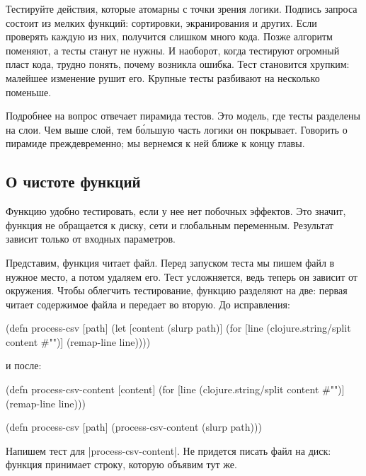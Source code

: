 Тестируйте действия, которые атомарны с точки зрения логики. Подпись запроса
состоит из мелких функций: сортировки, экранирования и других. Если проверять
каждую из них, получится слишком много кода. Позже алгоритм поменяют, а тесты
станут не нужны. И наоборот, когда тестируют огромный пласт кода, трудно понять,
почему возникла ошибка. Тест становится хрупким: малейшее изменение рушит
его. Крупные тесты разбивают на несколько поменьше.

Подробнее на вопрос отвечает пирамида
тестов. Это модель, где
тесты разделены на слои. Чем выше слой, тем б\'{о}льшую часть логики он
покрывает. Говорить о пирамиде преждевременно; мы вернемся к ней ближе к концу
главы.

\subsection{О чистоте функций}

Функцию удобно тестировать, если у нее нет побочных эффектов. Это значит,
функция не обращается к диску, сети и глобальным переменным. Результат зависит
только от входных параметров.

Представим, функция читает файл. Перед запуском теста мы пишем файл в нужное
место, а потом удаляем его. Тест усложняется, ведь теперь он зависит от
окружения. Чтобы облегчить тестирование, функцию разделяют на две: первая читает
содержимое файла и передает во вторую. До исправления:

\begin{english}
  \begin{clojure}
(defn process-csv [path]
  (let [content (slurp path)]
    (for [line (clojure.string/split content #"\n")]
      (remap-line line))))
  \end{clojure}
\end{english}

\noindent
и после:

\begin{english}
  \begin{clojure}
(defn process-csv-content [content]
  (for [line (clojure.string/split content #"\n")]
    (remap-line line)))

(defn process-csv [path]
  (process-csv-content (slurp path)))
  \end{clojure}
\end{english}

Напишем тест для \spverb|process-csv-content|. Не придется писать файл на диск:
функция принимает строку, которую объявим тут же.

